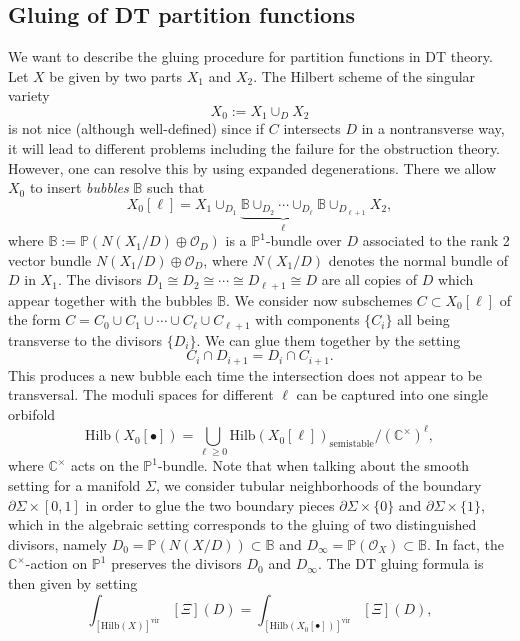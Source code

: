 \documentclass[11pt,colorinlistoftodos]{amsart}
\numberwithin{equation}{subsection}
\theoremstyle{plain}
\theoremstyle{definition}
\theoremstyle{remark}
\newcommand{\C}{\mathbb{C}}
\newcommand{\de}{\partial}
\begin{document}
\subsection{Gluing of DT partition functions}
We want to describe the gluing procedure for partition functions in DT theory. Let $X$ be given by two parts $X_1$ and $X_2$. The Hilbert scheme of the singular variety 
\[
X_0:=X_1\cup_DX_2
\]
is not nice (although well-defined) since if $C$ intersects $D$ in a nontransverse way, it will lead to different problems including the failure for the obstruction theory. However, one can resolve this by using expanded degenerations. There we allow $X_0$ to insert \emph{bubbles} $\mathbb{B}$ such that 
\[
X_0[\ell]=X_1\cup_{D_1}\underbrace{\mathbb{B}\cup_{D_2}\dotsm \cup_{D_{\ell}}\mathbb{B}}_{\ell}\cup_{D_{\ell+1}}X_2,
\]
where $\mathbb{B}:=\mathbb{P}(N(X_1/D)\oplus\mathcal{O}_D)$ is a $\mathbb{P}^1$-bundle over $D$ associated to the rank 2 vector bundle $N(X_1/D)\oplus\mathcal{O}_D$, where $N(X_1/D)$ denotes the normal bundle of $D$ in $X_1$. The divisors $D_1\cong D_2\cong\dotsm \cong D_{\ell+1}\cong D$ are all copies of $D$ which appear together with the bubbles $\mathbb{B}$. We consider now subschemes $C\subset X_0[\ell]$ of the form $C=C_0\cup C_1\cup \dotsm \cup C_\ell\cup C_{\ell+1}$ with components $\{C_i\}$ all being transverse to the divisors $\{D_i\}$. We can glue them together by the setting 
\[
C_i\cap D_{i+1}=D_i\cap C_{i+1}. 
\]
This produces a new bubble each time the intersection does not appear to be transversal. The moduli spaces for different $\ell$ can be captured into one single orbifold
\[
\mathrm{Hilb}(X_0[\bullet])=\bigcup_{\ell\geq 0}\mathrm{Hilb}(X_0[\ell])_{\mathrm{semistable}}\Big/(\mathbb{C}^\times)^\ell,
\]
where $\C^\times$ acts on the $\mathbb{P}^1$-bundle. Note that when talking about the smooth setting for a manifold $\Sigma$, we consider tubular neighborhoods of the boundary $\de\Sigma\times [0,1]$ in order to glue the two boundary pieces $\de\Sigma\times\{0\}$ and $\de\Sigma\times\{1\}$, which in the algebraic setting corresponds to the gluing of two distinguished divisors, namely $D_0=\mathbb{P}(N(X/D))\subset\mathbb{B}$ and $D_\infty=\mathbb{P}(\mathcal{O}_X)\subset \mathbb{B}$. In fact, the $\mathbb{C}^\times$-action on $\mathbb{P}^1$ preserves the divisors $D_0$ and $D_\infty$. The DT gluing formula is then given by setting
\begin{equation}
\label{eq:DT_gluing_1}
\int_{[\mathrm{Hilb}(X)]^\mathrm{vir}}[\Xi](D)=\int_{[\mathrm{Hilb}(X_0[\bullet])]^\mathrm{vir}}[\Xi](D),
\end{equation}
\end{document}
